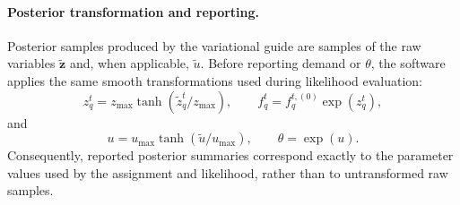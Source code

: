 \paragraph{Posterior transformation and reporting.}
Posterior samples produced by the variational guide are samples of the raw variables
$\widetilde{\bm z}$ and, when applicable, $\widetilde u$. Before reporting demand or
$\theta$, the software applies the same smooth transformations used during likelihood
evaluation:
\[
z_q^t=z_{\max}\tanh(\widetilde z_q^t/z_{\max}),
\qquad
f_q^t=f_q^{t,(0)}\exp(z_q^t),
\]
and
\[
u=u_{\max}\tanh(\widetilde u/u_{\max}),
\qquad \theta=\exp(u).
\]
Consequently, reported posterior summaries correspond exactly to the parameter values
used by the assignment and likelihood, rather than to untransformed raw samples.

